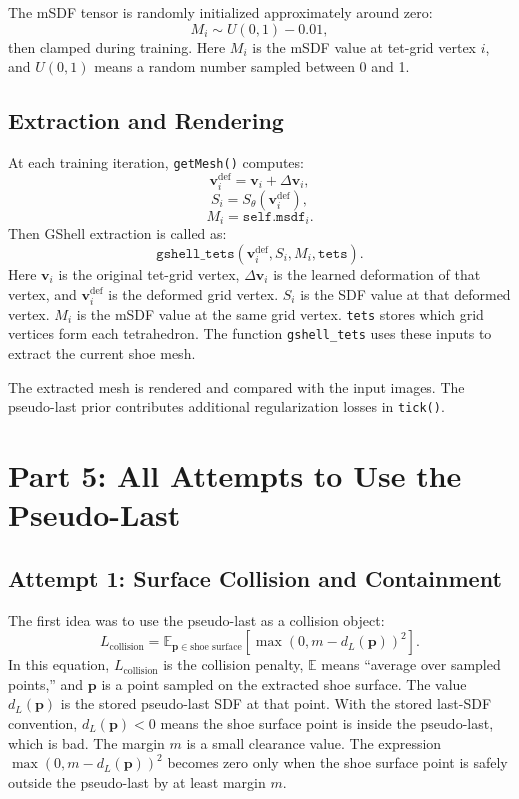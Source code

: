\documentclass[11pt]{article}
\newcommand{\pt}{\mathbf{p}}
\newcommand{\vtx}{\mathbf{v}}
\begin{document}
The mSDF tensor is randomly initialized approximately around zero:
\[
M_i \sim U(0,1)-0.01,
\]
then clamped during training.  Here \(M_i\) is the mSDF value at tet-grid
vertex \(i\), and \(U(0,1)\) means a random number sampled between 0 and 1.

\subsection{Extraction and Rendering}

At each training iteration, \texttt{getMesh()} computes:
\[
\vtx_i^{\text{def}} = \vtx_i + \Delta \vtx_i,
\]
\[
S_i = S_\theta(\vtx_i^{\text{def}}),
\]
\[
M_i = \texttt{self.msdf}_i.
\]
Then GShell extraction is called as:
\[
\texttt{gshell\_tets}(\vtx_i^{\text{def}}, S_i, M_i, \texttt{tets}).
\]
Here \(\vtx_i\) is the original tet-grid vertex, \(\Delta\vtx_i\) is the
learned deformation of that vertex, and \(\vtx_i^{\text{def}}\) is the deformed
grid vertex.  \(S_i\) is the SDF value at that deformed vertex.  \(M_i\) is the
mSDF value at the same grid vertex.  \texttt{tets} stores which grid vertices
form each tetrahedron.  The function \texttt{gshell\_tets} uses these inputs to
extract the current shoe mesh.

The extracted mesh is rendered and compared with the input images.  The
pseudo-last prior contributes additional regularization losses in
\texttt{tick()}.

\section{Part 5: All Attempts to Use the Pseudo-Last}

\subsection{Attempt 1: Surface Collision and Containment}

The first idea was to use the pseudo-last as a collision object:
\[
L_{\text{collision}}
=
\mathbb{E}_{\pt\in \text{shoe surface}}
\left[
\max(0,m-d_L(\pt))^2
\right].
\]
In this equation, \(L_{\text{collision}}\) is the collision penalty,
\(\mathbb{E}\) means ``average over sampled points,'' and \(\pt\) is a point
sampled on the extracted shoe surface.  The value \(d_L(\pt)\) is the stored
pseudo-last SDF at that point.  With the stored last-SDF convention,
\(d_L(\pt)<0\) means the shoe surface point is inside the pseudo-last, which is
bad.  The margin \(m\) is a small clearance value.  The expression
\(\max(0,m-d_L(\pt))^2\) becomes zero only when the shoe surface point is safely
outside the pseudo-last by at least margin \(m\).
\end{document}

